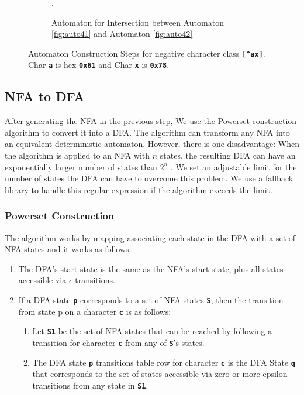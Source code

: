\begin{figure}[htbp]
\begin{subfigure}[b]{\textwidth}
\caption{Automaton for Intersection between Automaton \ref{fig:auto41} and Automaton \ref{fig:auto42}}.
\label{fig:auto43}
\end{subfigure}

\caption{Automaton Construction Steps for negative character class \texttt{\textbf{[\textasciicircum ax]}}. Char \texttt{\textbf{a}} is hex \texttt{\textbf{0x61}} and Char \texttt{\textbf{x}} is \texttt{\textbf{0x78}}.}
\label{fig:auto4}
\end{figure}


\subsection{NFA to DFA}\label{subsection:nfdtodfa}
After generating the NFA in the previous step, We use the Powerset construction algorithm to convert it into a DFA. The algorithm can transform any NFA into an equivalent deterministic automaton. However, there is one disadvantage: When the algorithm is applied to an NFA with $n$ states, the resulting DFA can have an exponentially larger number of states than $2^n$ \cite{dfasize}. We set an adjustable limit for the number of states the DFA can have to overcome this problem. We use a fallback library to handle this regular expression if the algorithm exceeds the limit.

\subsubsection{Powerset Construction}
The algorithm works by mapping associating each state in the DFA with a set of NFA states and it works as follows:
\begin{enumerate}
    \item The DFA's start state is the same as the NFA's start state, plus all states accessible via $\epsilon$-transitions.
    \item If a DFA state \texttt{\textbf{p}} corresponds to a set of NFA states \texttt{\textbf{S}}, then the transition from state p on a character \texttt{\textbf{c}} is as follows:
    \begin{enumerate}
        \item Let \texttt{\textbf{S1}} be the set of NFA states that can be reached by following a transition for character \texttt{\textbf{c}} from any of \texttt{\textbf{S}}'s states.
        \item The DFA state \texttt{\textbf{p}} transitions table row for character \texttt{\textbf{c}} is the DFA State \texttt{\textbf{q}} that corresponds to the set of states accessible via zero or more epsilon transitions from any state in \texttt{\textbf{S1}}.
    \end{enumerate}
\end{enumerate}
 

